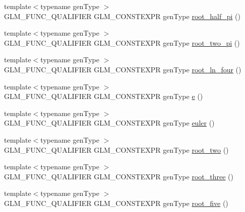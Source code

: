 \begin{DoxyCompactItemize}
\item 
{\footnotesize template$<$typename gen\+Type $>$ }\\G\+L\+M\+\_\+\+F\+U\+N\+C\+\_\+\+Q\+U\+A\+L\+I\+F\+I\+E\+R G\+L\+M\+\_\+\+C\+O\+N\+S\+T\+E\+X\+P\+R gen\+Type \hyperlink{group__gtc__constants_ga4e276cb823cc5e612d4f89ed99c75039}{root\+\_\+half\+\_\+pi} ()
\item 
{\footnotesize template$<$typename gen\+Type $>$ }\\G\+L\+M\+\_\+\+F\+U\+N\+C\+\_\+\+Q\+U\+A\+L\+I\+F\+I\+E\+R G\+L\+M\+\_\+\+C\+O\+N\+S\+T\+E\+X\+P\+R gen\+Type \hyperlink{group__gtc__constants_ga2bcedc575039fe0cd765742f8bbb0bd3}{root\+\_\+two\+\_\+pi} ()
\item 
{\footnotesize template$<$typename gen\+Type $>$ }\\G\+L\+M\+\_\+\+F\+U\+N\+C\+\_\+\+Q\+U\+A\+L\+I\+F\+I\+E\+R G\+L\+M\+\_\+\+C\+O\+N\+S\+T\+E\+X\+P\+R gen\+Type \hyperlink{group__gtc__constants_ga4129412e96b33707a77c1a07652e23e2}{root\+\_\+ln\+\_\+four} ()
\item 
{\footnotesize template$<$typename gen\+Type $>$ }\\G\+L\+M\+\_\+\+F\+U\+N\+C\+\_\+\+Q\+U\+A\+L\+I\+F\+I\+E\+R G\+L\+M\+\_\+\+C\+O\+N\+S\+T\+E\+X\+P\+R gen\+Type \hyperlink{group__gtc__constants_ga4b7956eb6e2fbedfc7cf2e46e85c5139}{e} ()
\item 
{\footnotesize template$<$typename gen\+Type $>$ }\\G\+L\+M\+\_\+\+F\+U\+N\+C\+\_\+\+Q\+U\+A\+L\+I\+F\+I\+E\+R G\+L\+M\+\_\+\+C\+O\+N\+S\+T\+E\+X\+P\+R gen\+Type \hyperlink{group__gtc__constants_gad8fe2e6f90bce9d829e9723b649fbd42}{euler} ()
\item 
{\footnotesize template$<$typename gen\+Type $>$ }\\G\+L\+M\+\_\+\+F\+U\+N\+C\+\_\+\+Q\+U\+A\+L\+I\+F\+I\+E\+R G\+L\+M\+\_\+\+C\+O\+N\+S\+T\+E\+X\+P\+R gen\+Type \hyperlink{group__gtc__constants_ga74e607d29020f100c0d0dc46ce2ca950}{root\+\_\+two} ()
\item 
{\footnotesize template$<$typename gen\+Type $>$ }\\G\+L\+M\+\_\+\+F\+U\+N\+C\+\_\+\+Q\+U\+A\+L\+I\+F\+I\+E\+R G\+L\+M\+\_\+\+C\+O\+N\+S\+T\+E\+X\+P\+R gen\+Type \hyperlink{group__gtc__constants_ga4f286be4abe88be1eed7d2a9f6cb193e}{root\+\_\+three} ()
\item 
{\footnotesize template$<$typename gen\+Type $>$ }\\G\+L\+M\+\_\+\+F\+U\+N\+C\+\_\+\+Q\+U\+A\+L\+I\+F\+I\+E\+R G\+L\+M\+\_\+\+C\+O\+N\+S\+T\+E\+X\+P\+R gen\+Type \hyperlink{group__gtc__constants_gae9ebbded75b53d4faeb1e4ef8b3347a2}{root\+\_\+five} ()

\end{DoxyCompactItemize}
